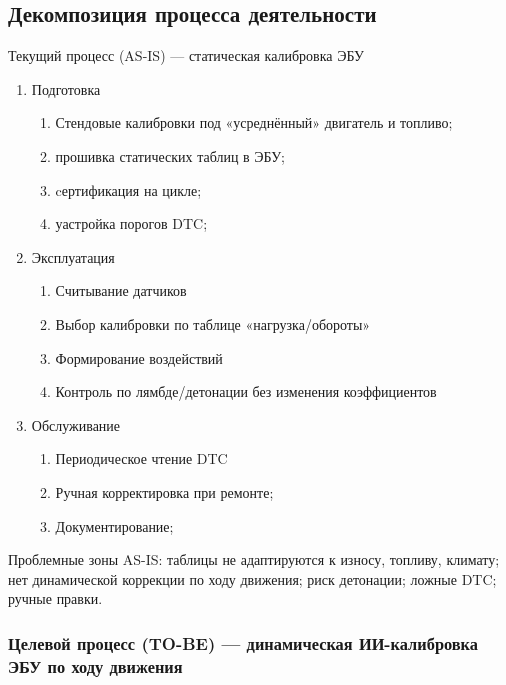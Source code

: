 \documentclass[14pt, a4paper]{extarticle}
\begin{document}
		\subsection{Декомпозиция процесса деятельности}
		
		
		Текущий процесс (AS-IS) — статическая калибровка ЭБУ
		
		\begin{enumerate}
			\item Подготовка
			
			\begin{enumerate}
				\item Стендовые калибровки под «усреднённый» двигатель и топливо;
				\item прошивка статических таблиц в ЭБУ;
				\item cертификация на цикле;
				\item уастройка порогов DTC;
			\end{enumerate}
			
			\item Эксплуатация
			\begin{enumerate}
				\item Считывание датчиков
				\item Выбор калибровки по таблице «нагрузка/обороты»
				\item Формирование воздействий
				\item Контроль по лямбде/детонации без изменения коэффициентов
				
			\end{enumerate}
			
			\item Обслуживание
			\begin{enumerate}
				\item Периодическое чтение DTC
				\item Ручная корректировка при ремонте;
				\item Документирование;
			\end{enumerate}
			
		\end{enumerate}
		
		Проблемные зоны AS-IS: таблицы не адаптируются к износу, топливу, климату; нет динамической коррекции по ходу движения; риск детонации; ложные DTC; ручные правки.
		
		\subsubsection{Целевой процесс (TO-BE) — динамическая ИИ-калибровка ЭБУ по ходу движения}
		
\end{document}
